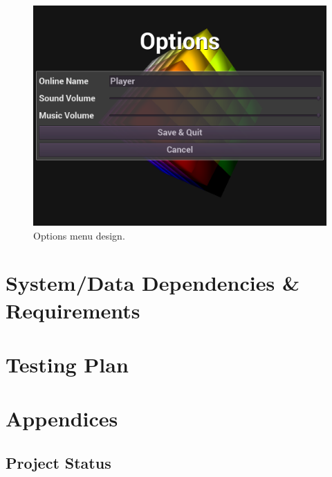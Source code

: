 \documentclass[12pt]{article}
\begin{document}
    \begin{figure}[H]
        \centering
        \includegraphics[width=4.5in]{Anttris_OptionsMenu.png}
        \caption{Options menu design.}
    \end{figure}
\section{System/Data Dependencies \& Requirements}
\section{Testing Plan}
\section{Appendices}
\subsection{Project Status}



\end{document}
